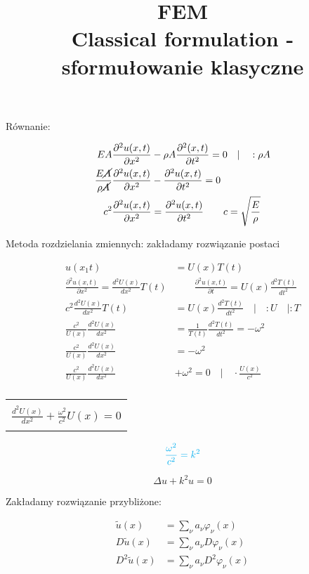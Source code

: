 \documentclass[9pt, a4paper]{article}
\title{\textbf{\Large FEM}\\Classical formulation - sformułowanie klasyczne}
\author{}
\date{}
\begin{document}
\maketitle

Równanie: 

\begin{align*}
EA\frac{\partial^2u(x,t)}{\partial x^2}&-\rho A\frac{\partial^2(x,t)}{\partial t^2}=0\quad|\quad:\rho A\\
\frac{E\cancel{A}}{\rho\cancel{A}}\frac{\partial^2u(x,t)}{\partial x^2}&-\frac{\partial^2u(x,t)}{\partial t^2}=0\\
c^2\frac{\partial^2u(x,t)}{\partial x^2}&=\frac{\partial^2u(x,t)}{\partial t^2}\qquad c=\sqrt{\frac{E}{\rho}}
\end{align*}

Metoda rozdzielania zmiennych: zakładamy rozwiązanie postaci

\begin{align*}
u(x_1t)&=U(x)T(t)\\
\frac{\partial^2u(x,t)}{\partial x^2}=\frac{d^2U(x)}{dx^2}T(t) &\qquad\frac{\partial^2u(x,t)}{\partial t}=U(x)\frac{d^2T(t)}{dt^2}\\
c^2\frac{d^2U(x)}{dx^2}T(t)&=U(x)\frac{d^2T(t)}{dt^2}\quad|\quad :U\quad|:T\\
\frac{c^2}{U(x)}\frac{d^2U(x)}{dx^2}&=\frac{1}{T(t)}\frac{d^2T(t)}{dt^2}=-\omega^2\\
\frac{c^2}{U(x)}\frac{d^2U(x)}{dx^2}&=-\omega^2\\
\frac{c^2}{U(x)}\frac{d^2U(x)}{dx^2}&+\omega^2=0\quad|\quad\cdot\frac{U(x)}{c^2}\\
\end{align*}

\begin{center}
\begin{tabular}{||c||}
\hline
\\
\(\frac{d^2U(x)}{dx^2}+\frac{\omega^2}{c^2}U(x)=0\)\\
\\
\hline
\end{tabular}

\[\color{cyan}\frac{\omega^2}{c^2}=k^2\]
\end{center}


\[\Delta u+k^2u=0\]

Zakładamy rozwiązanie przybliżone:

\begin{align*}
\tilde{u}(x)&=\sum_{\nu}a_\nu\varphi_\nu(x)\\
D\tilde{u}(x)&=\sum_\nu a_\nu D\varphi_\nu(x)\\
D^2\tilde{u}(x)&=\sum_\nu a_\nu D^2\varphi_\nu(x) 
\end{align*}
\end{document}
